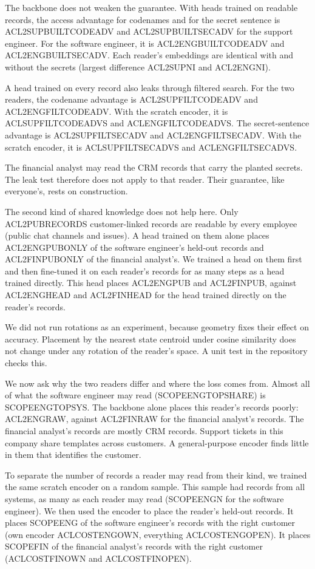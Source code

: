 \documentclass[11pt]{article}
\begin{document}
The backbone does not weaken the guarantee. With heads trained on readable records, the access advantage for codenames and for the secret sentence is ACL2SUPBUILTCODEADV and ACL2SUPBUILTSECADV for the support engineer. For the software engineer, it is ACL2ENGBUILTCODEADV and ACL2ENGBUILTSECADV. Each reader's embeddings are identical with and without the secrets (largest difference ACL2SUPNI and ACL2ENGNI).

A head trained on every record also leaks through filtered search. For the two readers, the codename advantage is ACL2SUPFILTCODEADV and ACL2ENGFILTCODEADV. With the scratch encoder, it is ACLSUPFILTCODEADVS and ACLENGFILTCODEADVS. The secret-sentence advantage is ACL2SUPFILTSECADV and ACL2ENGFILTSECADV. With the scratch encoder, it is ACLSUPFILTSECADVS and ACLENGFILTSECADVS.

The financial analyst may read the CRM records that carry the planted secrets. The leak test therefore does not apply to that reader. Their guarantee, like everyone's, rests on construction.

The second kind of shared knowledge does not help here. Only ACL2PUBRECORDS customer-linked records are readable by every employee (public chat channels and issues). A head trained on them alone places ACL2ENGPUBONLY of the software engineer's held-out records and ACL2FINPUBONLY of the financial analyst's. We trained a head on them first and then fine-tuned it on each reader's records for as many steps as a head trained directly. This head places ACL2ENGPUB and ACL2FINPUB, against ACL2ENGHEAD and ACL2FINHEAD for the head trained directly on the reader's records.

We did not run rotations as an experiment, because geometry fixes their effect on accuracy. Placement by the nearest state centroid under cosine similarity does not change under any rotation of the reader's space. A unit test in the repository checks this.

We now ask why the two readers differ and where the loss comes from. Almost all of what the software engineer may read (SCOPEENGTOPSHARE) is SCOPEENGTOPSYS. The backbone alone places this reader's records poorly: ACL2ENGRAW, against ACL2FINRAW for the financial analyst's records. The financial analyst's records are mostly CRM records. Support tickets in this company share templates across customers. A general-purpose encoder finds little in them that identifies the customer.

To separate the number of records a reader may read from their kind, we trained the same scratch encoder on a random sample. This sample had records from all systems, as many as each reader may read (SCOPEENGN for the software engineer). We then used the encoder to place the reader's held-out records. It places SCOPEENG of the software engineer's records with the right customer (own encoder ACLCOSTENGOWN, everything ACLCOSTENGOPEN). It places SCOPEFIN of the financial analyst's records with the right customer (ACLCOSTFINOWN and ACLCOSTFINOPEN).
\end{document}

